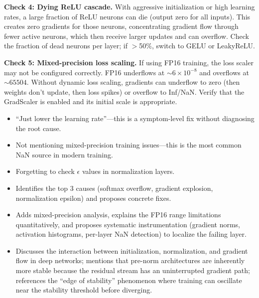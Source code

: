 \begin{interviewq}
\textbf{Check 4: Dying ReLU cascade.} With aggressive initialization or high learning rates, a large fraction of ReLU neurons can die (output zero for all inputs). This creates zero gradients for those neurons, concentrating gradient flow through fewer active neurons, which then receive larger updates and can overflow. Check the fraction of dead neurons per layer; if $>$50\%, switch to GELU or LeakyReLU.

\textbf{Check 5: Mixed-precision loss scaling.} If using FP16 training, the loss scaler may not be configured correctly. FP16 underflows at $\sim 6 \times 10^{-8}$ and overflows at $\sim 65504$. Without dynamic loss scaling, gradients can underflow to zero (then weights don't update, then loss spikes) or overflow to Inf/NaN. Verify that the GradScaler is enabled and its initial scale is appropriate.

\redflags
\begin{itemize}
    \item ``Just lower the learning rate''---this is a symptom-level fix without diagnosing the root cause.
    \item Not mentioning mixed-precision training issues---this is the most common NaN source in modern training.
    \item Forgetting to check $\epsilon$ values in normalization layers.
\end{itemize}


\goodgreat
\begin{itemize}
    \item {} Identifies the top 3 causes (softmax overflow, gradient explosion, normalization epsilon) and proposes concrete fixes.
    \item {} Adds mixed-precision analysis, explains the FP16 range limitations quantitatively, and proposes systematic instrumentation (gradient norms, activation histograms, per-layer NaN detection) to localize the failing layer.
    \item {} Discusses the interaction between initialization, normalization, and gradient flow in deep networks; mentions that pre-norm architectures are inherently more stable because the residual stream has an uninterrupted gradient path; references the ``edge of stability'' phenomenon where training can oscillate near the stability threshold before diverging.
\end{itemize}

\end{interviewq}

